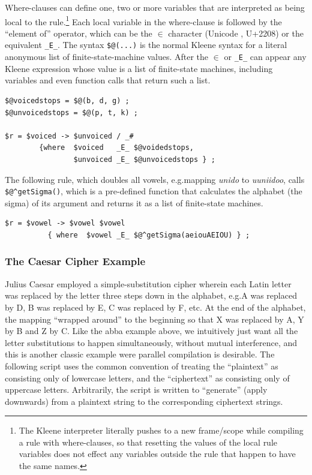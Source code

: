 Where-clauses can define one, two or more variables that are interpreted as being
local to the rule.\footnote{The Kleene interpreter literally pushes to a new
frame/scope while compiling a rule with where-clauses, so that resetting the
values of the local rule variables does not effect any variables outside the rule
that happen to have the same names.}  Each local variable in the where-clause is
followed by the ``element of'' operator, which can be the $\in$ character
(Unicode , U+2208) or the  equivalent \verb!_E_!.  The
syntax \verb!$@(...)! is the normal Kleene syntax for a literal anonymous list of
finite-state-machine values.  After the $\in$ or \verb!_E_! can appear any Kleene
expression whose value is a list of finite-state machines, including variables
and even function calls that return such a list.

\begin{samepage}
\begin{Verbatim}
$@voicedstops = $@(b, d, g) ;
$@unvoicedstops = $@(p, t, k) ;

$r = $voiced -> $unvoiced / _#  
        {where  $voiced   _E_ $@voidedstops, 
                $unvoiced _E_ $@unvoicedstops } ;
\end{Verbatim}
\end{samepage}

\noindent
The following rule, which doubles all vowels, e.g.\@ mapping \emph{unido} to
\emph{uuniidoo}, calls \verb!$@^getSigma()!, which is a pre-defined function that
calculates the alphabet (the sigma) of its
argument and returns it as a list of finite-state machines.

\begin{Verbatim}
$r = $vowel -> $vowel $vowel 
          { where  $vowel _E_ $@^getSigma(aeiouAEIOU) } ;
\end{Verbatim}

\subsubsection{The Caesar Cipher Example}

Julius Caesar employed a simple-substitution cipher wherein each Latin letter was replaced by the letter three steps down
in the alphabet, e.g.\@ A was replaced by D, B was replaced by E, C was replaced by F, etc.  At the end of the alphabet,
the mapping ``wrapped around'' to the beginning so that X was replaced by A, Y by B and Z by C.  Like the abba example
above, we intuitively just want all the letter substitutions to happen simultaneously, without mutual interference, and
this is another classic example were parallel compilation is desirable.  The following script uses the common convention
of treating the ``plaintext'' as consisting only of lowercase letters, and the ``ciphertext'' as consisting only of uppercase
letters.  Arbitrarily, the script is written to ``generate'' (apply downwards) from a plaintext string to the
corresponding ciphertext strings.


